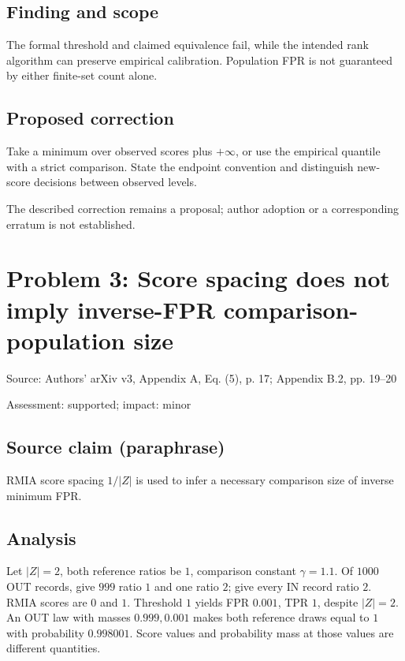 \documentclass[11pt]{article}
\begin{document}
\subsection*{Finding and scope}

The formal threshold and claimed equivalence fail, while the intended rank algorithm can preserve empirical calibration. Population FPR is not guaranteed by either finite-set count alone.

\subsection*{Proposed correction}

Take a minimum over observed scores plus \(+\infty\), or use the empirical quantile with a strict comparison. State the endpoint convention and distinguish new-score decisions between observed levels.

The described correction remains a proposal; author adoption or a corresponding erratum is not established.

\section*{Problem 3: Score spacing does not imply inverse-FPR comparison-population size}

Source: Authors’ arXiv v3, Appendix A, Eq. (5), p. 17; Appendix B.2, pp. 19–20

Assessment: supported; impact: minor

\subsection*{Source claim (paraphrase)}

RMIA score spacing \(1/|Z|\) is used to infer a necessary comparison size of inverse minimum FPR.

\subsection*{Analysis}

Let \(|Z|=2\), both reference ratios be \(1\), comparison constant \(\gamma=1.1\). Of \(1000\) OUT records, give \(999\) ratio \(1\) and one ratio \(2\); give every IN record ratio \(2\). RMIA scores are \(0\) and \(1\). Threshold \(1\) yields FPR \(0.001\), TPR \(1\), despite \(|Z|=2\). An OUT law with masses \(0.999,0.001\) makes both reference draws equal to \(1\) with probability \(0.998001\). Score values and probability mass at those values are different quantities.
\end{document}
